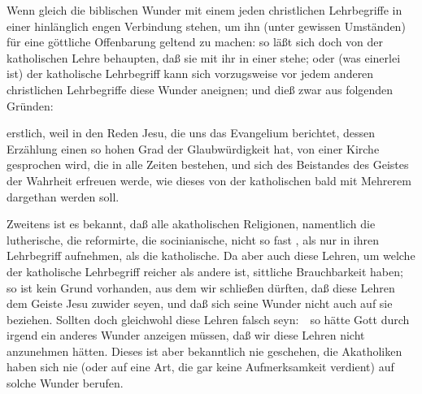 \begin{aufza}
\item Wenn gleich die biblischen Wunder mit einem jeden christlichen Lehrbegriffe in einer hinlänglich engen Verbindung stehen, um ihn (unter gewissen Umständen) für eine göttliche Offenbarung geltend zu machen: so läßt sich doch von der katholischen Lehre behaupten, daß sie mit ihr in einer  stehe; oder (was einerlei ist) der katholische Lehrbegriff kann sich vorzugsweise vor jedem anderen christlichen Lehrbegriffe diese Wunder aneignen; und dieß zwar aus folgenden Gründen:
\begin{aufzb}
\item erstlich, weil in den Reden Jesu, die uns das Evangelium berichtet, dessen Erzählung einen so hohen Grad der Glaubwürdigkeit hat, von einer Kirche gesprochen wird, die in alle Zeiten bestehen, und sich des Beistandes des Geistes der Wahrheit erfreuen werde, wie dieses von der katholischen bald mit Mehrerem dargethan werden soll.
\item Zweitens ist es bekannt, daß alle akatholischen Religionen, namentlich die lutherische, die reformirte, die socinianische, nicht so fast , als nur  in ihren Lehrbegriff aufnehmen, als die katholische. Da aber auch diese Lehren, um welche der katholische Lehrbegriff reicher als andere ist, sittliche Brauchbarkeit haben; so ist kein Grund vorhanden, aus dem wir schließen dürften, daß diese Lehren dem Geiste Jesu zuwider seyen, und daß sich seine Wunder nicht auch auf sie beziehen. Sollten doch gleichwohl diese Lehren falsch seyn:~\ so hätte Gott durch irgend ein anderes Wunder anzeigen müssen, daß wir diese Lehren nicht anzunehmen hätten. Dieses ist aber bekanntlich nie geschehen, die Akatholiken haben sich nie (oder auf eine Art, die gar keine Aufmerksamkeit verdient) auf solche Wunder berufen.
\end{aufzb}
\end{aufza}


